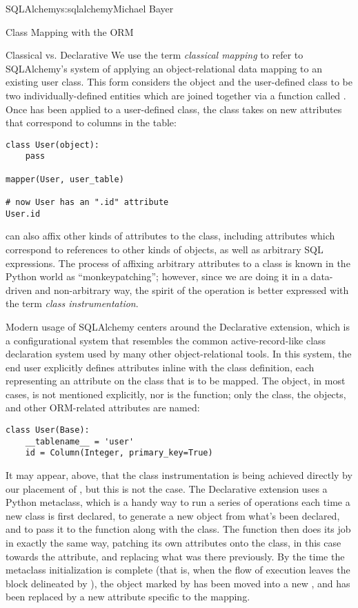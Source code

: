 \begin{aosachapter}{SQLAlchemy}{s:sqlalchemy}{Michael Bayer}
\begin{aosasect1}{Class Mapping with the ORM}
\begin{aosasect2}{Classical vs. Declarative}
We use the term \emph{classical mapping} to refer to SQLAlchemy's system of
applying an object-relational data mapping to an existing user class. This
form considers the  object and the user-defined class to be two
individually-defined entities which are joined together via a function called
. Once  has been applied to a user-defined class, the
class takes on new attributes that correspond to columns in the table:

\begin{verbatim}
class User(object):
    pass

mapper(User, user_table)

# now User has an ".id" attribute
User.id
\end{verbatim}

 can also affix other kinds of attributes to the class, including
attributes which correspond to references to other kinds of objects, as well
as arbitrary SQL expressions.  The process of affixing arbitrary attributes to
a class is known in the Python world as ``monkeypatching''; however, since we are
doing it in a data-driven and non-arbitrary way, the spirit of the operation is
better expressed with the term \emph{class instrumentation}.

Modern usage of SQLAlchemy centers around the Declarative extension,
which is a configurational system that resembles the common
active-record-like class declaration system used by many other
object-relational tools. In this system, the end user explicitly defines
attributes inline with the class definition, each representing an attribute on
the class that is to be mapped. The  object, in most cases, is not
mentioned explicitly, nor is the  function; only the class, the
 objects, and other ORM-related attributes are named:

\begin{verbatim}
class User(Base):
    __tablename__ = 'user'
    id = Column(Integer, primary_key=True)
\end{verbatim}

It may appear, above, that the class instrumentation is being achieved directly
by our placement of , but this is not the case.   The Declarative
extension uses a Python metaclass, which is a handy way to run a series
of operations each time a new class is first declared, to generate a new 
object from what's been declared, and to pass it to the  function along with
the class.  The  function then does its job in exactly the same way,
patching its own attributes onto the class, in this case towards the  attribute,
and replacing what was there previously.  By the time the metaclass initialization is complete
(that is, when the flow of execution leaves the block delineated by ), the
 object marked by  has been moved into a new , and 
has been replaced by a new attribute specific to the mapping.


\end{aosasect2}
\end{aosasect1}
\end{aosachapter}
